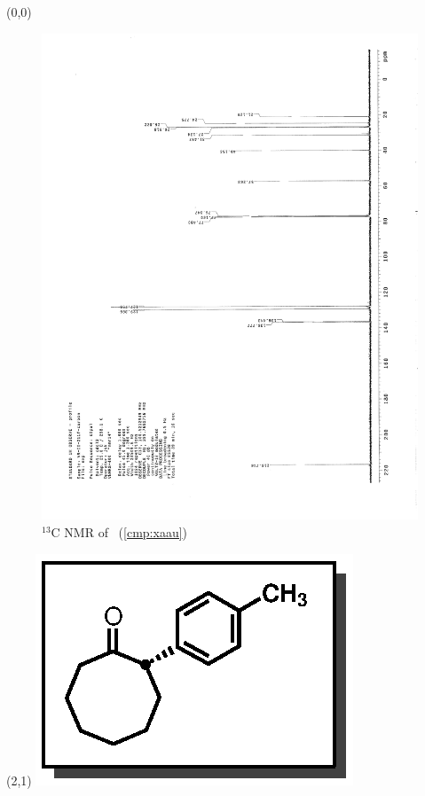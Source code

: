 \clearpage
\begin{textblock}{20}(0,0)
\begin{figure}[htb]
\caption{$^{13}$C NMR of  \CMPxaau\ (\ref{cmp:xaau})}
\includegraphics[scale=0.75, trim = 0mm 0mm 0mm 5mm,
clip]{chp_asymmetric/images/nmr/xaauC}
\vspace{-100pt}
\end{figure}
\end{textblock}
\begin{textblock}{1}(2,1)
\includegraphics[scale=0.8, angle=90]{chp_asymmetric/images/xaau}
\end{textblock}
\clearpage

